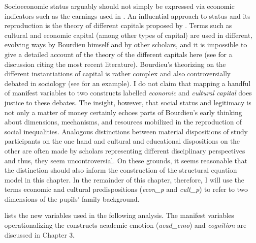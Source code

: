 \documentclass[output=paper]{langsci/langscibook}
\begin{document}
Socioeconomic status arguably should not simply be expressed via economic indicators such as the earnings used in . An influential approach to status and its reproduction is the theory of different capitals proposed by \citet{Bourdieu1979}. Terms such as cultural and economic capital (among other types of capital) are used in different, evolving ways by Bourdieu himself and by other scholars, and it is impossible to give a detailed account of the theory of the different capitals here (see \citealt{Farkas2018} for a discussion citing the most recent literature). Bourdieu’s theorizing on the different instantiations of capital is rather complex and also controversially debated in sociology (see \citealt{Riley2017} for an example). I do not claim that mapping a handful of manifest variables to two constructs labelled \textit{economic} and \textit{cultural} \textit{capital} does justice to these debates. The insight, however, that social status and legitimacy is not only a matter of money certainly echoes parts of Bourdieu’s early thinking about dimensions, mechanisms, and resources mobilized in the reproduction of social inequalities. Analogous distinctions between material dispositions of study participants on the one hand and cultural and educational dispositions on the other are often made by scholars representing different disciplinary perspectives and thus, they seem  uncontroversial. On these grounds, it seems reasonable that the distinction should also inform the construction of the structural equation model in this chapter. In the remainder of this chapter, therefore, I will use the terms economic and cultural predispositions (\textit{econ\_p} and \textit{cult\_p}) to refer to two dimensions of the pupils’ family background.

 lists the new variables used in the following analysis. The manifest variables operationalizing the constructs academic emotion (\textit{acad\_emo}) and \textit{cognition} are discussed in Chapter 3.
\end{document}
